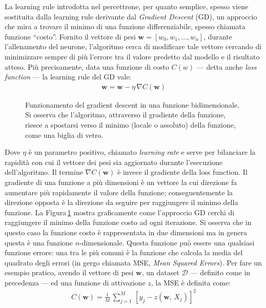 La learning rule introdotta nel percettrone, per quanto semplice, spesso viene sostituita dalla learning rule derivante dal \textit{Gradient Descent} (\acs{GD}), un approccio che mira a trovare il minimo di una funzione differenziabile, spesso chiamata funzione ``costo''. Fornito il vettore di pesi $\mathbf{w} = \left[w_0, w_1, \dots, w_n \right]$, durante l'allenamento del neurone, l'algoritmo cerca di modificare tale vettore cercando di minimizzare sempre di più l'errore tra il valore predetto dal modello e il risultato atteso. Più precisamente, data una funzione di costo $C(w)$ — detta anche \textit{loss function} — la learning rule del \acs{GD} vale:
% 
\begin{gather*}
    \mathbf{w} = \mathbf{w} - \eta\,\nabla C\left(\mathbf{w}\right)
\end{gather*}
% 
\begin{figure}[!b]
    \centering
    
    \caption[Funzionamento del gradient descent in una funzione bidimensionale.]{Funzionamento del gradient descent in una funzione bidimensionale. Si osserva che l'algoritmo, attraverso il gradiente della funzione, riesce a spostarsi verso il minimo (locale o assoluto) della funzione, come una biglia di vetro.}\label{fig:gradient-descent}
\end{figure}
% 
\noindent Dove $\eta$ è un parametro positivo, chiamato \textit{learning rate} e serve per bilanciare la rapidità con cui il vettore dei pesi sia aggiornato durante l'esecuzione dell'algoritmo. Il termine $\nabla C\left(\mathbf{w}\right)$ è invece il gradiente della loss function. Il gradiente di una funzione a più dimensioni è un vettore la cui direzione fa aumentare più rapidamente il valore della funzione; conseguentemente la direzione opposta è la direzione da seguire per raggiungere il minimo della funzione. La Figura\,\ref{fig:gradient-descent} mostra graficamente come l'approccio \acs{GD} cerchi di raggiungere il minimo della funzione costo ad ogni iterazione. Si osserva che in questo caso la funzione costo è rappresentata in due dimensioni ma in genera questa è una funzione $n$-dimensionale. Questa funzione può essere una qualsiasi funzione errore: una tra le più comuni è la funzione che calcola la media del quadrato degli errori (in gergo chiamata \acs{MSE}, \textit{Mean Squared Errors}). Per fare un esempio pratico, avendo il vettore di pesi $\mathbf{w}$, un dataset $\mathcal{D}$ — definito come in precedenza — ed una funzione di attivazione $z$, la \acs{MSE} è definita come:
% 
\begin{gather*}
    C(\mathbf{w}) = \frac{1}{M}\,\sum_{j = 1}^M\,{\left[ y_j - z(\mathbf{w},\,X_j) \right]}^2
\end{gather*}
